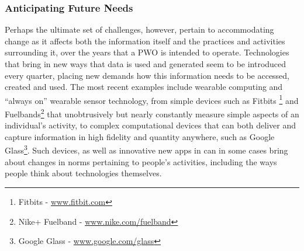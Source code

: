 \documentclass[letterpaper]{sig-alternate}
\begin{document}

\subsubsection{Anticipating Future Needs}
Perhaps the ultimate set of challenges, however, pertain to accommodating change as it affects both the information itself and the practices and activities surrounding it, over the years that a PWO is intended to operate.  Technologies that bring in new ways that data is used and generated seem to be introduced every quarter, placing new demands how this information needs to be accessed, created and used.  The most recent examples include wearable computing and ``always on'' wearable sensor technology, from simple devices such as Fitbits \footnote{Fitbits - \url{www.fitbit.com}} and Fuelbands\footnote{Nike+ Fuelband - \url{www.nike.com/fuelband}} that unobtrusively but nearly constantly measure simple aspects of an individual's activity, to complex computational devices that can both deliver and capture information in high fidelity and quantity anywhere, such as Google Glass\footnote{Google Glass - \url{www.google.com/glass}}.  Such devices, as well as innovative new apps in can in some cases bring about changes in norms pertaining to people's activities, including the ways people think about technologies themselves.

\end{document}
